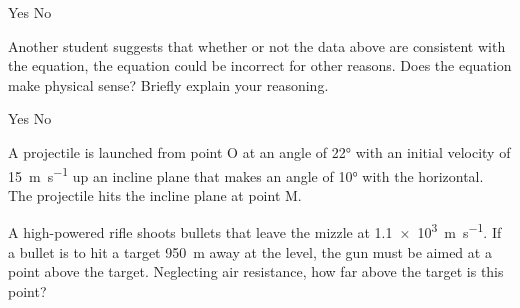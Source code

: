 \documentclass{../../../oss-ap12ibhl}
\begin{document}
\begin{questions}
\begin{parts}
\begin{subparts}
      \vspace{.1in}
      \underline{\hspace{.25in}} Yes\hspace{.5in}
      \underline{\hspace{.25in}} No

      \vspace{.1in}

      \subpart Another student suggests that whether or not the data above are
      consistent with the equation, the equation could be incorrect for other
      reasons. Does the equation make physical sense? Briefly explain your
      reasoning.

      \vspace{.1in}
      \underline{\hspace{.25in}} Yes\hspace{.5in}
      \underline{\hspace{.25in}} No
    
      \vspace{.1in}
    \end{subparts}
  \end{parts}
  \newpage
  
  
  \question A projectile is launched from point O at an angle of \ang{22} with
  an initial velocity of \SI{15}{\metre\per\second} up an incline plane that
  makes an angle of \ang{10} with the horizontal. The projectile hits the
  incline plane at point M.
  \newpage
  
  \question A high-powered rifle shoots bullets that leave the mizzle at
  \SI{1.1e3}{\metre\per\second}. If a bullet is to hit a target
  \SI{950}{\metre} away at the level, the gun must be aimed at a point above
  the target. Neglecting air resistance, how far above the target is this
  point?
  

\end{questions}
\end{document}
